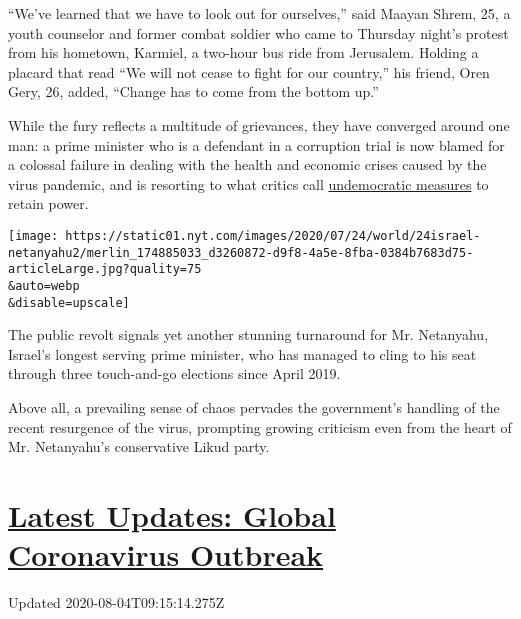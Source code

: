 ``We've learned that we have to look out for ourselves,'' said Maayan
Shrem, 25, a youth counselor and former combat soldier who came to
Thursday night's protest from his hometown, Karmiel, a two-hour bus ride
from Jerusalem. Holding a placard that read ``We will not cease to fight
for our country,'' his friend, Oren Gery, 26, added, ``Change has to
come from the bottom up.''

While the fury reflects a multitude of grievances, they have converged
around one man: a prime minister who is a defendant in a corruption
trial is now blamed for a colossal failure in dealing with the health
and economic crises caused by the virus pandemic, and is resorting to
what critics call
\href{https://www.nytimes.com/2020/03/18/world/middleeast/israel-virus-netanyahu.html?searchResultPosition=2}{undemocratic
measures} to retain power.

\texttt{[image: https://static01.nyt.com/images/2020/07/24/world/24israel-netanyahu2/merlin\_174885033\_d3260872-d9f8-4a5e-8fba-0384b7683d75-articleLarge.jpg?quality=75\\\&auto=webp\\\&disable=upscale]}

The public revolt signals yet another stunning turnaround for Mr.
Netanyahu, Israel's longest serving prime minister, who has managed to
cling to his seat through three touch-and-go elections since April 2019.

Above all, a prevailing sense of chaos pervades the government's
handling of the recent resurgence of the virus, prompting growing
criticism even from the heart of Mr. Netanyahu's conservative Likud
party.

\hypertarget{latest-updates-global-coronavirus-outbreak}{%
\section{\texorpdfstring{\href{https://www.nytimes.com/2020/08/04/world/coronavirus-covid-19.html?action=click\&pgtype=Article\&state=default\&region=MAIN_CONTENT_1\&context=storylines_live_updates}{Latest
Updates: Global Coronavirus
Outbreak}}{Latest Updates: Global Coronavirus Outbreak}}\label{latest-updates-global-coronavirus-outbreak}}

Updated 2020-08-04T09:15:14.275Z

